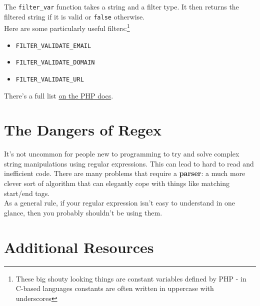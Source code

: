 The \texttt{filter\_var} function takes a string and a filter type. It then returns the filtered string if it is valid or \texttt{false} otherwise.
\\

Here are some particularly useful filters:\footnote{These big shouty looking things are constant variables defined by PHP - in C-based languages constants are often written in uppercase with underscores}

\begin{itemize}
    \item \texttt{FILTER\_VALIDATE\_EMAIL}
    \item \texttt{FILTER\_VALIDATE\_DOMAIN}
    \item \texttt{FILTER\_VALIDATE\_URL}
\end{itemize}

There's a full list \href{https://www.php.net/manual/en/filter.filters.validate.php}{on the PHP docs}.



\section{The Dangers of Regex}


It's not uncommon for people new to programming to try and solve complex string manipulations using regular expressions. This can lead to hard to read and inefficient code. There are many problems that require a \textbf{parser}: a much more clever sort of algorithm that can elegantly cope with things like matching start/end tags.
\\

As a general rule, if your regular expression isn't easy to understand in one glance, then you probably shouldn't be using them.



\section{Additional Resources}

